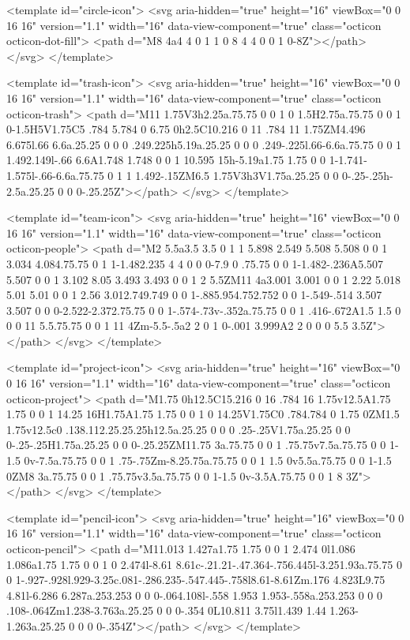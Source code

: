 <template id="circle-icon">
  <svg aria-hidden="true" height="16" viewBox="0 0 16 16" version="1.1" width="16" data-view-component="true" class="octicon octicon-dot-fill">
    <path d="M8 4a4 4 0 1 1 0 8 4 4 0 0 1 0-8Z"></path>
</svg>
</template>

<template id="trash-icon">
  <svg aria-hidden="true" height="16" viewBox="0 0 16 16" version="1.1" width="16" data-view-component="true" class="octicon octicon-trash">
    <path d="M11 1.75V3h2.25a.75.75 0 0 1 0 1.5H2.75a.75.75 0 0 1 0-1.5H5V1.75C5 .784 5.784 0 6.75 0h2.5C10.216 0 11 .784 11 1.75ZM4.496 6.675l.66 6.6a.25.25 0 0 0 .249.225h5.19a.25.25 0 0 0 .249-.225l.66-6.6a.75.75 0 0 1 1.492.149l-.66 6.6A1.748 1.748 0 0 1 10.595 15h-5.19a1.75 1.75 0 0 1-1.741-1.575l-.66-6.6a.75.75 0 1 1 1.492-.15ZM6.5 1.75V3h3V1.75a.25.25 0 0 0-.25-.25h-2.5a.25.25 0 0 0-.25.25Z"></path>
</svg>
</template>

<template id="team-icon">
  <svg aria-hidden="true" height="16" viewBox="0 0 16 16" version="1.1" width="16" data-view-component="true" class="octicon octicon-people">
    <path d="M2 5.5a3.5 3.5 0 1 1 5.898 2.549 5.508 5.508 0 0 1 3.034 4.084.75.75 0 1 1-1.482.235 4 4 0 0 0-7.9 0 .75.75 0 0 1-1.482-.236A5.507 5.507 0 0 1 3.102 8.05 3.493 3.493 0 0 1 2 5.5ZM11 4a3.001 3.001 0 0 1 2.22 5.018 5.01 5.01 0 0 1 2.56 3.012.749.749 0 0 1-.885.954.752.752 0 0 1-.549-.514 3.507 3.507 0 0 0-2.522-2.372.75.75 0 0 1-.574-.73v-.352a.75.75 0 0 1 .416-.672A1.5 1.5 0 0 0 11 5.5.75.75 0 0 1 11 4Zm-5.5-.5a2 2 0 1 0-.001 3.999A2 2 0 0 0 5.5 3.5Z"></path>
</svg>
</template>

<template id="project-icon">
  <svg aria-hidden="true" height="16" viewBox="0 0 16 16" version="1.1" width="16" data-view-component="true" class="octicon octicon-project">
    <path d="M1.75 0h12.5C15.216 0 16 .784 16 1.75v12.5A1.75 1.75 0 0 1 14.25 16H1.75A1.75 1.75 0 0 1 0 14.25V1.75C0 .784.784 0 1.75 0ZM1.5 1.75v12.5c0 .138.112.25.25.25h12.5a.25.25 0 0 0 .25-.25V1.75a.25.25 0 0 0-.25-.25H1.75a.25.25 0 0 0-.25.25ZM11.75 3a.75.75 0 0 1 .75.75v7.5a.75.75 0 0 1-1.5 0v-7.5a.75.75 0 0 1 .75-.75Zm-8.25.75a.75.75 0 0 1 1.5 0v5.5a.75.75 0 0 1-1.5 0ZM8 3a.75.75 0 0 1 .75.75v3.5a.75.75 0 0 1-1.5 0v-3.5A.75.75 0 0 1 8 3Z"></path>
</svg>
</template>

<template id="pencil-icon">
  <svg aria-hidden="true" height="16" viewBox="0 0 16 16" version="1.1" width="16" data-view-component="true" class="octicon octicon-pencil">
    <path d="M11.013 1.427a1.75 1.75 0 0 1 2.474 0l1.086 1.086a1.75 1.75 0 0 1 0 2.474l-8.61 8.61c-.21.21-.47.364-.756.445l-3.251.93a.75.75 0 0 1-.927-.928l.929-3.25c.081-.286.235-.547.445-.758l8.61-8.61Zm.176 4.823L9.75 4.81l-6.286 6.287a.253.253 0 0 0-.064.108l-.558 1.953 1.953-.558a.253.253 0 0 0 .108-.064Zm1.238-3.763a.25.25 0 0 0-.354 0L10.811 3.75l1.439 1.44 1.263-1.263a.25.25 0 0 0 0-.354Z"></path>
</svg>
</template>

